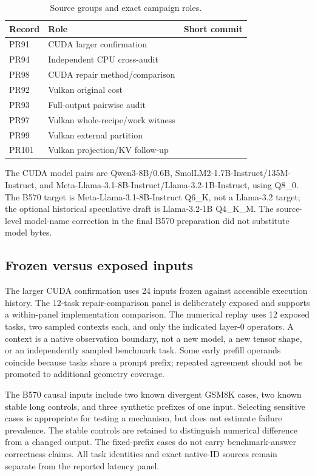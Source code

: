 \begin{table}[h]\centering\small
\caption{Source groups and exact campaign roles.}\label{tab:sourcegroups}
\begin{tabularx}{\columnwidth}{@{}lYl@{}}\toprule
Record & Role & Short commit\\\midrule
PR91 & CUDA larger confirmation &\\
PR94 & Independent CPU cross-audit &\\
PR98 & CUDA repair method/comparison &\\
PR92 & Vulkan original cost &\\
PR93 & Full-output pairwise audit &\\
PR97 & Vulkan whole-recipe/work witness &\\
PR99 & Vulkan external partition &\\
PR101 & Vulkan projection/KV follow-up &\\\bottomrule
\end{tabularx}
\end{table}

The CUDA model pairs are Qwen3-8B/0.6B, SmolLM2-1.7B-Instruct/135M-Instruct, and Meta-Llama-3.1-8B-Instruct/Llama-3.2-1B-Instruct, using Q8\_0. The B570 target is Meta-Llama-3.1-8B-Instruct Q6\_K, not a Llama-3.2 target; the optional historical speculative draft is Llama-3.2-1B Q4\_K\_M. The source-level model-name correction in the final B570 preparation did not substitute model bytes.

\subsection{Frozen versus exposed inputs}
The larger CUDA confirmation uses 24 inputs frozen against accessible execution history. The 12-task repair-comparison panel is deliberately exposed and supports a within-panel implementation comparison. The numerical replay uses 12 exposed tasks, two sampled contexts each, and only the indicated layer-0 operators. A context is a native observation boundary, not a new model, a new tensor shape, or an independently sampled benchmark task. Some early prefill operands coincide because tasks share a prompt prefix; repeated agreement should not be promoted to additional geometry coverage.

The B570 causal inputs include two known divergent GSM8K cases, two known stable long controls, and three synthetic prefixes of one input. Selecting sensitive cases is appropriate for testing a mechanism, but does not estimate failure prevalence. The stable controls are retained to distinguish numerical difference from a changed output. The fixed-prefix cases do not carry benchmark-answer correctness claims. All task identities and exact native-ID sources remain separate from the reported latency panel.

